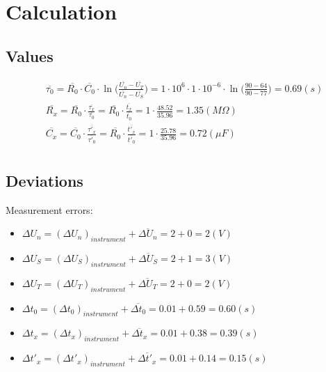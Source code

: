 \documentclass[12pt, a4paper]{article}
\newcommand{\avg}{\overline}
\newcommand{\Dt}{\Delta}
\newcommand{\hi}{\section}
\newcommand{\hii}{\subsection}
\begin{document}
\hi{Calculation}
    \hii{Values}
        \begin{align*}
            & \avg{\tau_{0}} = \avg{R_{0}} \cdot \avg{C_{0}} \cdot
                \ln\big(\frac{\avg{U_{n}} - \avg{U_{T}}}{\avg{U_{n}} - \avg{U_{S}}}\big)
            = 1 \cdot 10^{6} \cdot 1 \cdot 10^{-6} \cdot \ln\big(\frac{90 - 64}{90 - 77}\big)
            = 0.69 (s) \\
            & \avg{R_{x}} = \avg{R_{0}} \cdot \frac{\avg{\tau_{x}}}{\avg{\tau_{0}}}
                = \avg{R_{0}} \cdot \frac{\avg{t_{x}}}{\avg{t_{0}}}
            = 1 \cdot \frac{48.52}{35.96} = 1.35 (M\Omega) \\
            & \avg{C_{x}} = \avg{C_{0}} \cdot \frac{\avg{\tau'_{x}}}{\avg{\tau'_{0}}}
                = \avg{R_{0}} \cdot \frac{\avg{t'_{x}}}{\avg{t'_{0}}}
                = 1 \cdot \frac{25.78}{35.96} = 0.72 (\mu F) \\
        \end{align*}
    \hii{Deviations}
        \par Measurement errors:
        \begin{itemize}
            \item $\Dt U_{n} = (\Dt U_{n})_{instrument} + \avg{\Dt U_{n}} = 2 + 0 = 2 (V)$
            \item $\Dt U_{S} = (\Dt U_{S})_{instrument} + \avg{\Dt U_{S}} = 2 + 1 = 3 (V)$
            \item $\Dt U_{T} = (\Dt U_{T})_{instrument} + \avg{\Dt U_{T}} = 2 + 0 = 2 (V)$
            \item $\Dt t_{0} = (\Dt t_{0})_{instrument} + \avg{\Dt t_{0}} = 0.01 + 0.59 = 0.60 (s)$
            \item $\Dt t_{x} = (\Dt t_{x})_{instrument} + \avg{\Dt t_{x}} = 0.01 + 0.38 = 0.39 (s)$
            \item $\Dt t'_{x} = (\Dt t'_{x})_{instrument} + \avg{\Dt t'_{x}} = 0.01 + 0.14 = 0.15 (s)$
        \end{itemize}
        
\end{document}
